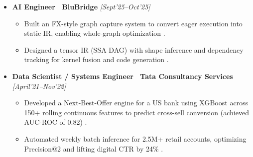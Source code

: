 \documentclass[10pt,article]{article}
\begin{document}
\begin{itemize}
\begin{itemize}
\item \textbf{Cost Impact:} Translated forecast improvements into a 30\% reduction in projected operational expenses (estimated \$2--3M) on simulated demand scenarios, demonstrating direct cost impact of model gains .
\item \textbf{Energy System Sizing Optimization:} Replaced a legacy Differential Evolution + L-BFGS-B model ($>$10s solve) with Bayesian Optimization + L-BFGS-B, cutting solve time to 2--3s for live browser trial runs displaying instant ROI previews ($\sim$20\% savings) .
\item \textbf{Drift Monitoring and Sanity Benchmarking:} Engineered an event-driven, asynchronous drift-monitoring pipeline using async I/O and concurrent workers to run distribution-shift checks across MCP, solar/wind, demand, tariff/PPA inputs, and optimization outputs without blocking the core optimization workload; formulated a parallel LP model to benchmark the lightweight BO solution and validate near-global optimality.
\item \textbf{Deployment \& Infrastructure:} Containerized all frameworks with Docker and automated deployments on AWS via CI/CD pipelines, ensuring reproducible builds and consistent environments across dev and staging .
   \end{itemize}
   \item \textbf{AI Engineer \textbar\ BluBridge} \hfill \textit{[Sept'25--Oct'25]}
   \begin{itemize}
       \item Built an FX-style graph capture system to convert eager execution into static IR, enabling whole-graph optimization .
       \item Designed a tensor IR (SSA DAG) with shape inference and dependency tracking for kernel fusion and code generation .
   \end{itemize}
   \item \textbf{Data Scientist / Systems Engineer \textbar\ Tata Consultancy Services} \hfill \textit{[April'21--Nov'22]}
   \begin{itemize}
       \item Developed a Next-Best-Offer engine for a US bank using XGBoost across 150+ rolling continuous features to predict cross-sell conversion (achieved AUC-ROC of 0.82) .
       \item Automated weekly batch inference for 2.5M+ retail accounts, optimizing Precision@2 and lifting digital CTR by 24\% .
   \end{itemize}
\end{itemize}
\end{document}
